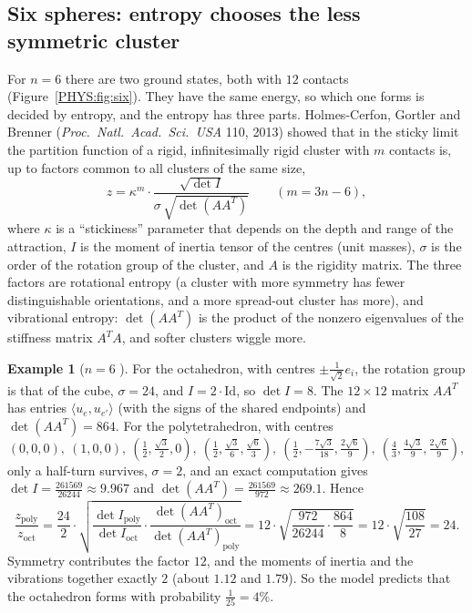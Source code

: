 \documentclass[11pt,openany]{book}
\theoremstyle{plain}
\theoremstyle{definition}
\newtheorem{example}[theorem]{Example}
\theoremstyle{remark}
\newcommand{\ip}[2]{\langle #1, #2\rangle}
\begin{document}
\subsection*{Six spheres: entropy chooses the less symmetric cluster}
For $n=6$ there are two ground states, both with $12$ contacts (Figure~\ref{PHYS:fig:six}). They have the same
energy, so which one forms is decided by entropy, and the entropy has three parts. Holmes-Cerfon,
Gortler and Brenner (\emph{Proc.\ Natl.\ Acad.\ Sci.\ USA} 110, 2013) showed that in the sticky limit the
partition function of a rigid, infinitesimally rigid cluster with $m$ contacts is, up to factors common
to all clusters of the same size,
\begin{equation}\label{PHYS:eq:sticky}
  z=\kappa^m\cdot\frac{\sqrt{\det I}}{\sigma\,\sqrt{\det(AA^T)}}\qquad(m=3n-6),
\end{equation}
where $\kappa$ is a ``stickiness'' parameter that depends on the depth and range of the attraction, $I$ is the
moment of inertia tensor of the centres (unit masses), $\sigma$ is the order of the rotation group of the
cluster, and $A$ is the rigidity matrix. The three factors are rotational entropy (a cluster with more
symmetry has fewer distinguishable orientations, and a more spread-out cluster has more), and vibrational
entropy: $\det(AA^T)$ is the product of the nonzero eigenvalues of the stiffness matrix $A^TA$, and
softer clusters wiggle more.

\begin{example}[$n=6$ ]\label{PHYS:ex:six}
For the octahedron, with centres $\pm\frac1{\sqrt2}e_i$, the rotation group is that of the cube,
$\sigma=24$, and $I=2\cdot\mathrm{Id}$, so $\det I=8$. The $12\times12$ matrix $AA^T$ has entries
$\ip{u_e}{u_{e'}}$ (with the signs of the shared endpoints) and $\det(AA^T)=864$. For the polytetrahedron,
with centres
\[
  (0,0,0),\ (1,0,0),\ (\tfrac12,\tfrac{\sqrt3}2,0),\ (\tfrac12,\tfrac{\sqrt3}6,\tfrac{\sqrt6}3),\
  (\tfrac12,-\tfrac{7\sqrt3}{18},\tfrac{2\sqrt6}9),\ (\tfrac43,\tfrac{4\sqrt3}9,\tfrac{2\sqrt6}9),
\]
only a half-turn survives, $\sigma=2$, and an exact computation gives $\det I=\frac{261569}{26244}\approx9.967$ and
$\det(AA^T)=\frac{261569}{972}\approx269.1$. Hence
\[
  \frac{z_{\mathrm{poly}}}{z_{\mathrm{oct}}}
  =\frac{24}2\cdot\sqrt{\frac{\det I_{\mathrm{poly}}}{\det I_{\mathrm{oct}}}\cdot\frac{\det(AA^T)_{\mathrm{oct}}}{\det(AA^T)_{\mathrm{poly}}}}
  =12\cdot\sqrt{\frac{972}{26244}\cdot\frac{864}8}=12\cdot\sqrt{\frac{108}{27}}=24 .
\]
Symmetry contributes the factor $12$, and the moments of inertia and the vibrations together exactly $2$
(about $1.12$ and $1.79$). So the model predicts that the octahedron forms with probability $\frac1{25}=4\%$.
\end{example}
\end{document}
